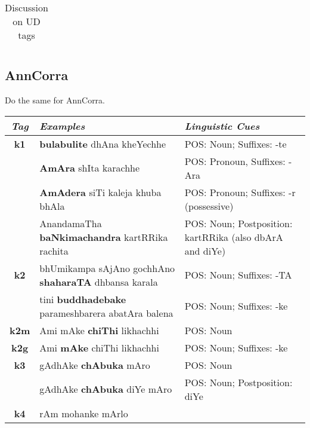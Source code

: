 \documentclass[a4 paper]{article}
\begin{document}
\begin{longtable}{cp{}p{}}
\caption{Discussion on UD tags}
\label{tab:udtable}
\end{longtable}

\subsection{AnnCorra}
Do the same for AnnCorra.

\begin{longtable}{cp{}p{}}
    \toprule
    \textit{Tag} & \textit{Examples} & \textit{Linguistic Cues} \\ 
    \toprule
    \addlinespace[0.5em]
    \textbf{k1}
                 & \textbf{bulabulite} dhAna kheYechhe
                 & POS: Noun; Suffixes: -te\\
    \addlinespace[0.5em]
                 & \textbf{AmAra} shIta karachhe
                 & POS: Pronoun, Suffixes: -Ara\\
    \addlinespace[0.5em]
                 & \textbf{AmAdera} siTi kaleja khuba bhAla
                 & POS: Pronoun; Suffixes: -r (possessive)\\
    \addlinespace[0.5em]
                 & AnandamaTha \textbf{baNkimachandra} kartRRika rachita
                 & POS: Noun; Postposition: kartRRika (also dbArA and diYe)\\
    \midrule
    \addlinespace[0.5em]
    \textbf{k2}
                 & bhUmikampa sAjAno gochhAno \textbf{shaharaTA} dhbansa karala
                 & POS: Noun; Suffixes: -TA\\
    \addlinespace[0.5em]
                 & tini \textbf{buddhadebake} parameshbarera abatAra balena
                 & POS: Noun; Suffixes: -ke\\
    \midrule
    \addlinespace[0.5em]
    \textbf{k2m}
                 & Ami mAke \textbf{chiThi} likhachhi
                 & POS: Noun\\
    \midrule
    \addlinespace[0.5em]
    \textbf{k2g}
                 & Ami \textbf{mAke} chiThi likhachhi
                 & POS: Noun; Suffixes: -ke\\
    \midrule
    \addlinespace[0.5em]
    \textbf{k3}
                 & gAdhAke \textbf{chAbuka} mAro
                 & POS: Noun\\
    \addlinespace[0.5em]
                 & gAdhAke \textbf{chAbuka} diYe mAro
                 & POS: Noun; Postposition: diYe\\
    \midrule
    \addlinespace[0.5em]
    \textbf{k4}
                 & rAm mohanke mArlo

\end{longtable}
\end{document}
